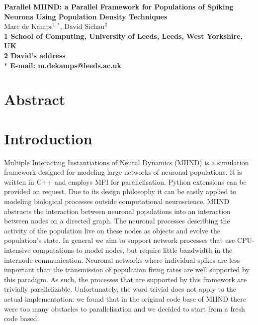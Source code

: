 \documentclass[12pt]{article}
\date{}
\begin{document}
\begin{center}
\thispagestyle{empty}
{\Large
\textbf{Parallel MIIND: a Parallel Framework for Populations of Spiking Neurons Using Population Density Techniques}
}
\vspace{1.0cm}
\\
Marc de Kamps$^{1,\ast}$, 
David Sichau$^{2}$
\vspace{0.5cm}
\\
\bf{1} School of Computing, University of Leeds, Leeds, West Yorkshire, UK
\\
\bf{2} David's address
\\
\vspace{0.5cm}
$\ast$ E-mail: m.dekamps@leeds.ac.uk
\end{center}

\section*{Abstract}


\newpage 
\setcounter{page}{1}
\linenumbers

\section{Introduction}
Multiple Interacting Instantiations of Neural Dynamics \citep{dekamps2008} (MIIND) is a simulation framework designed for modeling large networks of 
neuronal populations. It is written in C++ and employs MPI \citep{grop} for parallelisation. Python extensions can be provided on request. 
Due to its design philosophy it can be easily applied to modeling 
biological processes outside computational neuroscience. MIIND abstracts the interaction between neuronal populations into an interaction 
between nodes on a directed graph. The neuronal processes describing the activity of the population live on these nodes as objects and evolve 
the population’s state. In general we aim to support network processes that use CPU-intensive computations to model nodes, but
require little bandwidth in the internode communication. Neuronal networks where individual spikes are less important than the transmission
of population firing rates are well supported by this paradigm. As such, the processes that are supported by this framework are trivially
parallelizable. Unfortunately, the word trivial does not apply to the actual implementation: we found that in the original code base of MIIND there
were too many obstacles to parallelisation and we decided to start from a fresh code based. 
\end{document}
